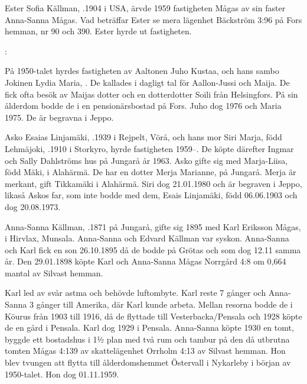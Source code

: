 %
Ester Sofia Källman, .1904 i USA, ärvde 1959 fastigheten Mågas av sin faster Anna-Sanna Mågas. Vad beträffar Ester se mera lägenhet Bäckström 3:96 på Fors hemman, nr 90 och 390. Ester hyrde ut fastigheten.


:

På 1950-talet hyrdes fastigheten av Aaltonen Juho Kustaa,  och hans sambo Jokinen Lydia Maria, . De kallades i dagligt tal för Aallon-Jussi och Maija. De fick ofta besök av Maijas dotter och en dotterdotter Soili från Helsingfors. På sin ålderdom bodde de i en pensionärsbostad på Fors. Juho dog 1976 och Maria 1975. De är begravna i Jeppo.

Asko Esaias Linjamäki, .1939 i Rejpelt, Vörå, och hans mor Siri Marja, född Lehmäjoki, .1910 i Storkyro, hyrde fastigheten 1959--. De köpte därefter Ingmar och Sally Dahlströms hus på Jungarå år 1963.	Asko gifte sig med Marja-Liisa, född Mäki,  i Alahärmä. De har en dotter Merja Marianne,  på Jungarå. Merja är merkant, gift Tikkamäki i Alahärmä. Siri dog 21.01.1980 och är begraven i Jeppo, likaså Askos far, som inte bodde med dem, Esais Linjamäki, född 06.06.1903 och dog 20.08.1973.


%
Anna-Sanna Källman, .1871 på Jungarå, gifte sig 1895 med Karl Eriksson Mågas,  i Hirvlax, Munsala. Anna-Sanna och Edvard Källman var syskon. Anna-Sanna och Karl fick en son 26.10.1895 då de bodde på Grötas och som dog 12.11 samma år. Den 29.01.1898 köpte Karl och Anna-Sanna Mågas Norrgård 4:8 om 0,664 mantal av Silvast hemman.

Karl led av svår astma och behövde luftombyte. Karl reste 7 gånger och Anna-Sanna 3 gånger till Amerika, där Karl kunde arbeta. Mellan resorna bodde de i Köurus från 1903 till 1916, då de flyttade till Vesterbacka/Pensala och 1928 köpte de en gård i Pensala. Karl dog 1929 i Pensala. Anna-Sanna köpte 1930 en tomt, byggde ett bostadshus i 1½ plan med två rum och tambur på den då utbrutna	tomten Mågas 4:139 av skattelägenhet Orrholm 4:13 av Silvast hemman. Hon blev tvungen att flytta till ålderdomshemmet Östervall i Nykarleby i början av 1950-talet. Hon dog 01.11.1959.



